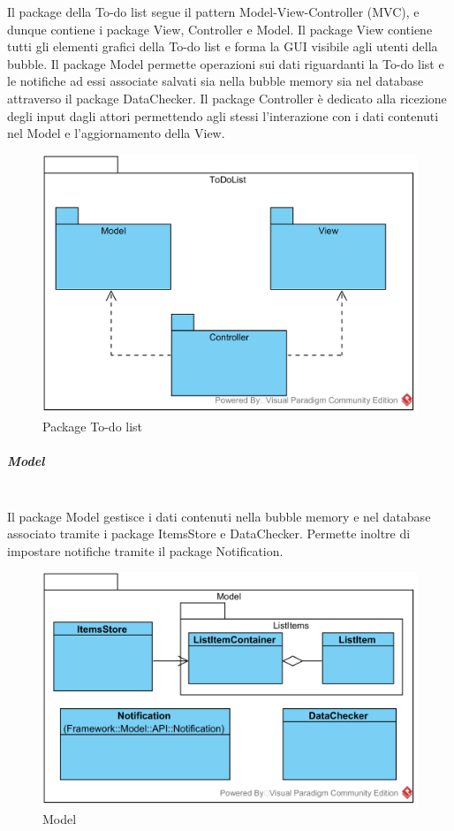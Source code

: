 Il package della To-do list segue il pattern Model-View-Controller (MVC), e dunque contiene i package View, Controller e Model. Il package View contiene tutti gli elementi grafici della To-do list e forma la GUI visibile agli utenti della bubble. Il package Model permette operazioni sui dati riguardanti la To-do list e le notifiche ad essi associate salvati sia nella bubble memory sia nel database attraverso il package DataChecker. Il package Controller è dedicato alla ricezione degli input dagli attori permettendo agli stessi l'interazione con i dati contenuti nel Model e l'aggiornamento della View.

\begin{figure}[H]
	\centering
	\includegraphics[width=14cm]{../../documenti/SpecificaTecnica/diagrammi_img/classi_e_package/todo.png}
	\caption{Package To-do list}
\end{figure}

\subparagraph{Model}\mbox{}\\
Il package Model gestisce i dati contenuti nella bubble memory e nel database associato tramite i package ItemsStore e DataChecker. Permette inoltre di impostare notifiche tramite il package Notification.  
\begin{figure}[H]
	\centering
	\includegraphics[width=14cm]{../../documenti/SpecificaTecnica/diagrammi_img/classi_e_package/todo_model.png}
	\caption{Model}
\end{figure}

